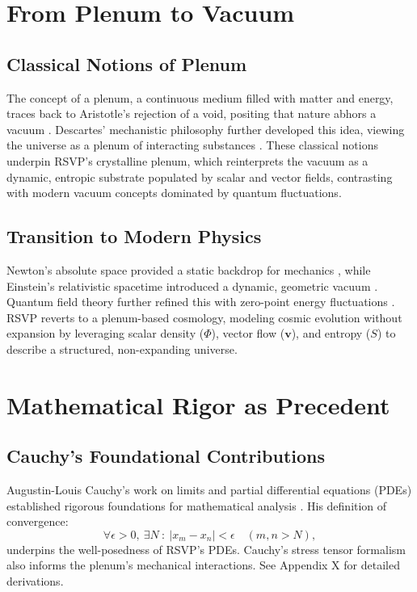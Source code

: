 \documentclass[12pt]{report}
\newcommand{\PhiRSVP}{\Phi}
\newcommand{\vRSVP}{\mathbf{v}}
\newcommand{\SRSVP}{S}
\begin{document}
\chapter{From Plenum to Vacuum}
\section{Classical Notions of Plenum}
The concept of a plenum, a continuous medium filled with matter and energy, traces back to Aristotle’s rejection of a void, positing that nature abhors a vacuum \citep{AristotlePhysics}. Descartes’ mechanistic philosophy further developed this idea, viewing the universe as a plenum of interacting substances \citep{Descartes1644}. These classical notions underpin RSVP’s crystalline plenum, which reinterprets the vacuum as a dynamic, entropic substrate populated by scalar and vector fields, contrasting with modern vacuum concepts dominated by quantum fluctuations.

\section{Transition to Modern Physics}
Newton’s absolute space provided a static backdrop for mechanics \citep{Newton1687}, while Einstein’s relativistic spacetime introduced a dynamic, geometric vacuum \citep{Einstein1915}. Quantum field theory further refined this with zero-point energy fluctuations \citep{Dirac1930}. RSVP reverts to a plenum-based cosmology, modeling cosmic evolution without expansion by leveraging scalar density (\(\PhiRSVP\)), vector flow (\(\vRSVP\)), and entropy (\(\SRSVP\)) to describe a structured, non-expanding universe.

\chapter{Mathematical Rigor as Precedent}
\section{Cauchy’s Foundational Contributions}
Augustin-Louis Cauchy’s work on limits and partial differential equations (PDEs) established rigorous foundations for mathematical analysis \citep{Cauchy1821}. His definition of convergence:
\begin{equation}
\forall \epsilon > 0, \ \exists N \ : \ |x_m - x_n| < \epsilon \quad (m, n > N), \label{eq:cauchy}
\end{equation}
underpins the well-posedness of RSVP’s PDEs. Cauchy’s stress tensor formalism also informs the plenum’s mechanical interactions. See Appendix X for detailed derivations.
\end{document}
